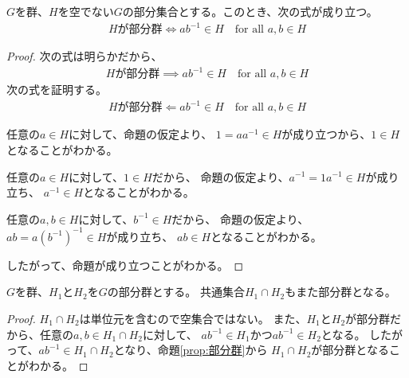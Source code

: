{	\begin{proposition}[部分群]\label{prop:部分群} %
		$G$を群、$H$を空でない$G$の部分集合とする。このとき、次の式が成り立つ。
		\begin{equation*}\begin{split}
			\text{$H$が部分群}
			\iff ab^{-1}\in H \quad\text{for all } a,b\in H
		\end{split}\end{equation*}
	\end{proposition} %
	\begin{proof} %
		次の式は明らかだから、
		\begin{equation*}\begin{split}
			\text{$H$が部分群}
			\implies ab^{-1}\in H \quad\text{for all } a,b\in H
		\end{split}\end{equation*}
		次の式を証明する。
		\begin{equation*}\begin{split}
			\text{$H$が部分群}
			\Leftarrow ab^{-1}\in H \quad\text{for all } a,b\in H
		\end{split}\end{equation*}
		\begin{description}\setlength{\itemsep}{-1mm} %
			\item[単位元] 任意の$a\in H$に対して、命題の仮定より、
			$1=aa^{-1}\in H$が成り立つから、$1\in H$となることがわかる。
			\item[逆元] 任意の$a\in H$に対して、$1\in H$だから、
			命題の仮定より、$a^{-1}=1a^{-1}\in H$が成り立ち、
			$a^{-1}\in H$となることがわかる。
			\item[積] 任意の$a,b\in H$に対して、$b^{-1}\in H$だから、
			命題の仮定より、$ab=a(b^{-1})^{-1}\in H$が成り立ち、
			$ab\in H$となることがわかる。
		\end{description} %
		したがって、命題が成り立つことがわかる。
	\end{proof} %

	\begin{proposition}[部分群の共通集合]\label{prop:部分群の共通集合} %
		$G$を群、$H_1$と$H_2$を$G$の部分群とする。
		共通集合$H_1\cap H_2$もまた部分群となる。
	\end{proposition} %
	\begin{proof} %
		$H_1\cap H_2$は単位元を含むので空集合ではない。
		また、$H_1$と$H_2$が部分群だから、任意の$a,b\in H_1\cap H_2$に対して、
		$ab^{-1}\in H_1$かつ$ab^{-1}\in H_2$となる。
		したがって、$ab^{-1}\in H_1\cap H_2$となり、命題\ref{prop:部分群}から
		$H_1\cap H_2$が部分群となることがわかる。
	\end{proof} %
}
